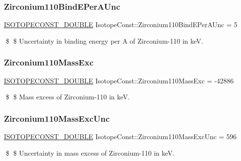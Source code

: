 \subsubsection{\texorpdfstring{Zirconium110\+Bind\+E\+Per\+A\+Unc}{Zirconium110BindEPerAUnc}}
{\footnotesize\ttfamily \mbox{\hyperlink{group___isotope_const-_macros_ga8f45a7272ce02c0b4c65c44636ed719a}{I\+S\+O\+T\+O\+P\+E\+C\+O\+N\+S\+T\+\_\+\+D\+O\+U\+B\+LE}} Isotope\+Const\+::\+Zirconium110\+Bind\+E\+Per\+A\+Unc = 5}

\$ \$ Uncertainty in binding energy per A of Zirconium-\/110 in keV. \mbox{\label{group___isotope_const-_zirconium-_zr110_gaf1fa95f252182f5e8cbf982fa71b7d5c}} 
\subsubsection{\texorpdfstring{Zirconium110\+Mass\+Exc}{Zirconium110MassExc}}
{\footnotesize\ttfamily \mbox{\hyperlink{group___isotope_const-_macros_ga8f45a7272ce02c0b4c65c44636ed719a}{I\+S\+O\+T\+O\+P\+E\+C\+O\+N\+S\+T\+\_\+\+D\+O\+U\+B\+LE}} Isotope\+Const\+::\+Zirconium110\+Mass\+Exc = -\/42886}

\$ \$ Mass excess of Zirconium-\/110 in keV. \mbox{\label{group___isotope_const-_zirconium-_zr110_ga01aafc8d224432371be70a3f21c8f165}} 
\subsubsection{\texorpdfstring{Zirconium110\+Mass\+Exc\+Unc}{Zirconium110MassExcUnc}}
{\footnotesize\ttfamily \mbox{\hyperlink{group___isotope_const-_macros_ga8f45a7272ce02c0b4c65c44636ed719a}{I\+S\+O\+T\+O\+P\+E\+C\+O\+N\+S\+T\+\_\+\+D\+O\+U\+B\+LE}} Isotope\+Const\+::\+Zirconium110\+Mass\+Exc\+Unc = 596}

\$ \$ Uncertainty in mass excess of Zirconium-\/110 in keV. \mbox{\label{group___isotope_const-_zirconium-_zr110_ga63fbc9d18b0deb074d16350224b57e46}} 
